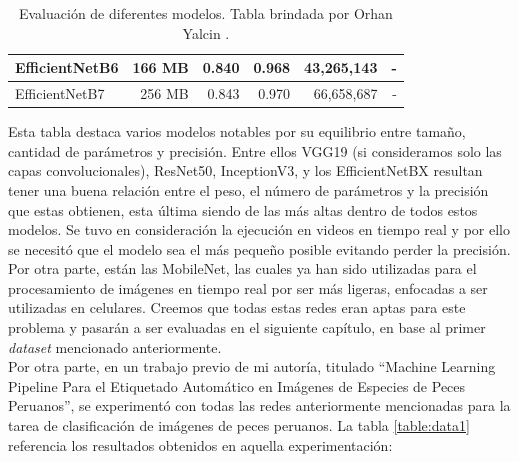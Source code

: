 \begin{table}[h!]
\begin{tabular}{|l|r|r|r|r|r|}
    EfficientNetB6                                               & 166 MB                             & 0.840                                                                                   & 0.968                                                                                   & 43,265,143                               & -                                   \\ \hline
    EfficientNetB7                                               & 256 MB                             & 0.843                                                                                   & 0.970                                                                                   & 66,658,687                               & -                                   \\ \hline
    \end{tabular}
    \caption{Evaluación de diferentes modelos. Tabla brindada por Orhan Yalcin \protect\cite{DataModelos}. }
    \label{evaluacion}
\end{table}

Esta tabla destaca varios modelos notables por su equilibrio entre 
tamaño, cantidad de parámetros y precisión. Entre ellos VGG19 
(si consideramos solo las capas convolucionales), ResNet50, InceptionV3, 
y los EfficientNetBX resultan tener una buena relación entre el peso, el 
número de parámetros y la precisión que estas obtienen, esta última 
siendo de las más altas dentro de todos estos modelos. Se tuvo en 
consideración la ejecución en videos en tiempo real y por ello se necesitó 
que el modelo sea el más pequeño posible evitando perder la precisión. Por 
otra parte, están las MobileNet, las cuales ya han sido utilizadas para el 
procesamiento de imágenes en tiempo real por ser más ligeras, enfocadas a 
ser utilizadas en celulares. Creemos que todas estas redes eran aptas para 
este problema y pasarán a ser evaluadas en el siguiente capítulo, en base 
al primer \textit{dataset} mencionado anteriormente. \\

Por otra parte, en un trabajo previo de mi autoría, titulado ``Machine 
Learning Pipeline Para el Etiquetado Automático en Imágenes de Especies de 
Peces Peruanos''\cite{Madera2024}, se experimentó con todas las 
redes anteriormente mencionadas para la tarea de clasificación de imágenes 
de peces peruanos. La tabla \ref{table:data1} referencia los resultados 
obtenidos en aquella experimentación:

